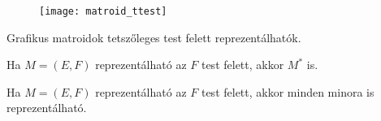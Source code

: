 \begin{figure}[h!]
\texttt{[image: matroid\_ttest]}
\centering
\end{figure}

\begin{theo} Grafikus matroidok tetszőleges test felett reprezentálhatók. \end{theo}
\begin{theo} Ha $M=(E,F)$ reprezentálható az $F$ test felett, akkor $M^{*}$ is. \end{theo}
\begin{theo} Ha $M=(E,F)$ reprezentálható az $F$ test felett, akkor minden minora is reprezentálható. \end{theo}
